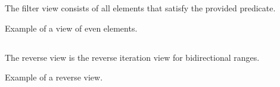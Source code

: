 The filter view consists of all elements that satisfy the provided predicate.

\begin{box-note}
\footnotesize Example of a view of even elements.
\tcblower
{}
\end{box-note}

\subsection{\texorpdfstring{}{\texttt{std::views::reverse}}}

The reverse view is the reverse iteration view for bidirectional ranges.

\begin{box-note}
\footnotesize Example of a reverse view.
\tcblower
{}
\end{box-note}


\subsection{\texorpdfstring{}{\texttt{std::views::counted}}}




